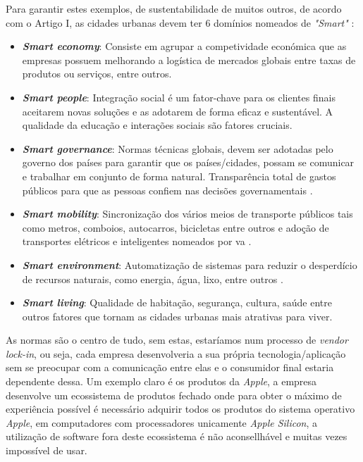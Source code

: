 Para garantir estes exemplos, de sustentabilidade de muitos outros, de acordo com o Artigo I, as cidades urbanas devem ter 6 domínios nomeados de \textit{"Smart"} \cite{article}:
\begin{itemize}
\item \textbf{\textit{Smart economy}}:  Consiste em agrupar a competividade económica que as empresas possuem melhorando a logística de mercados globais entre taxas de produtos ou serviços, entre outros.
\item \textbf{\textit{Smart people}}:  Integração social  é um fator-chave para os clientes finais aceitarem novas soluções e as adotarem de forma eficaz e sustentável. A qualidade da educação e interações sociais são fatores cruciais.
\item \textbf{\textit{Smart governance}}: Normas técnicas globais, devem ser adotadas pelo governo dos países para garantir que os países/cidades, possam se comunicar e trabalhar em conjunto de forma natural. Transparência total de gastos públicos para que as pessoas confiem nas decisões governamentais \cite{article}.
\item \textbf{\textit{Smart mobility}}: Sincronização dos vários meios de transporte públicos tais como metros, comboios, autocarros, bicicletas entre outros e adoção de transportes elétricos e inteligentes nomeados por \gls{va} \cite{CLEOPHAS2019801}.
\item \textbf{\textit{Smart environment}}: Automatização de sistemas para reduzir o desperdício de recursos naturais, como energia, água, lixo, entre outros \cite{su162411265}.
\item \textbf{\textit{Smart living}}: Qualidade de habitação, segurança, cultura, saúde entre outros fatores que tornam as cidades urbanas mais atrativas para viver.
\end{itemize}

As normas são o centro de tudo, sem estas, estaríamos num processo de \textit{vendor lock-in}, ou seja, cada empresa desenvolveria a sua própria tecnologia/aplicação sem se preocupar com a comunicação entre elas e o consumidor final estaria dependente dessa.
Um exemplo claro é os produtos da \textit{Apple}, a empresa desenvolve um ecossistema de produtos fechado onde para obter o máximo de experiência possível é necessário adquirir todos os produtos do sistema operativo \textit{Apple}, em computadores com processadores unicamente \textit{Apple Silicon}, a utilização de software  fora deste ecossistema é não aconsellhável e muitas vezes impossível de usar.

